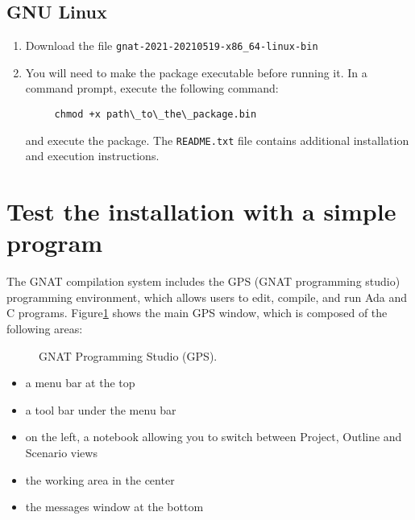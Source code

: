 \subsection{GNU Linux}
\begin{enumerate}
\item Download the file {\tt gnat-2021-20210519-x86\_64-linux-bin}
\item You will need to make the package executable before running it. In a command prompt, execute the following command:
\begin{verbatim}
     chmod +x path\_to\_the\_package.bin
\end{verbatim}
and execute the package. The {\tt README.txt} file contains additional installation and execution instructions.
\end{enumerate}

\section{Test the installation with a simple program}

The GNAT compilation system includes the GPS (GNAT programming studio) programming environment, which allows users to edit, compile, and run Ada and C programs. Figure\ref{fig:gps} shows the main GPS window, which is composed of the following areas:

\begin{figure}[h]
            \caption{GNAT Programming Studio (GPS).}
            \label{fig:gps}
\end{figure}

\begin{itemize}
\item	a menu bar at the top
\item	a tool bar under the menu bar
\item	on the left, a notebook allowing you to switch between Project, Outline and Scenario views
\item	the working area in the center
\item	the messages window at the bottom
\end{itemize}

